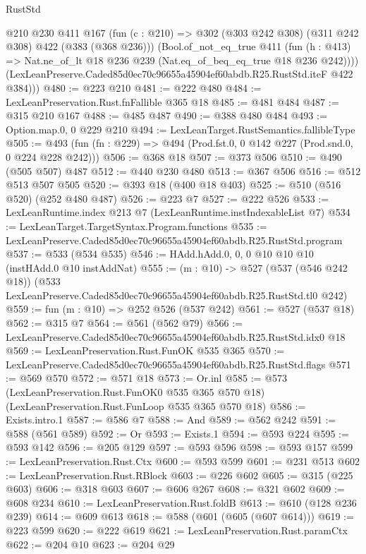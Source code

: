 \begin{lexlean}{RustStd}
\begin{coremodule}
          @210
          @230
          @411
          @167
          (fun (c : @210) => @302 (@303 @242 @308) (@311 @242 @308) @422 (@383 (@368 @236)))
          (Bool.of_not_eq_true
            @411
            (fun (h : @413) => Nat.ne_of_lt @18 @236 @239 (Nat.eq_of_beq_eq_true @18 @236 @242))))
        (LexLeanPreserve.Caded85d0ec70c96655a45904ef60abdb.R25.RustStd.iteF @422 @384)))
@480 := @223 @210
@481 := @222 @480
@484 := LexLeanPreservation.Rust.fnFallible @365 @18
@485 := @481 @484
@487 := @315 @210 @167
@488 := @485 @487
@490 := @388 @480 @484
@493 := Option.map.{0, 0} @229 @210
@494 := LexLeanTarget.RustSemantics.fallibleType
@505 := @493 (fun (fn : @229) => @494 (Prod.fst.{0, 0} @142 @227 (Prod.snd.{0, 0} @224 @228 @242)))
@506 := @368 @18
@507 := @373 @506
@510 := @490 (@505 @507) @487
@512 := @440 @230 @480
@513 := @367 @506
@516 := @512 @513 @507 @505
@520 := @393 @18 (@400 @18 @403)
@525 := @510 (@516 @520) (@252 @480 @487)
@526 := @223 @7
@527 := @222 @526
@533 := LexLeanRuntime.index @213 @7 (LexLeanRuntime.instIndexableList @7)
@534 := LexLeanTarget.TargetSyntax.Program.functions
@535 := LexLeanPreserve.Caded85d0ec70c96655a45904ef60abdb.R25.RustStd.program
@537 := @533 (@534 @535)
@546 := HAdd.hAdd.{0, 0, 0} @10 @10 @10 (instHAdd.{0} @10 instAddNat)
@555 := (m : @10) ->
  @527
    (@537 (@546 @242 @18))
    (@533 LexLeanPreserve.Caded85d0ec70c96655a45904ef60abdb.R25.RustStd.tl0 @242)
@559 := fun (m : @10) => @252 @526 (@537 @242)
@561 := @527 (@537 @18)
@562 := @315 @7
@564 := @561 (@562 @79)
@566 := LexLeanPreserve.Caded85d0ec70c96655a45904ef60abdb.R25.RustStd.idx0 @18
@569 := LexLeanPreservation.Rust.FunOK @535 @365
@570 := LexLeanPreserve.Caded85d0ec70c96655a45904ef60abdb.R25.RustStd.flags
@571 := @569 @570
@572 := @571 @18
@573 := Or.inl
@585 := @573
    (LexLeanPreservation.Rust.FunOK0 @535 @365 @570 @18)
    (LexLeanPreservation.Rust.FunLoop @535 @365 @570 @18)
@586 := Exists.intro.{1}
@587 := @586 @7
@588 := And
@589 := @562 @242
@591 := @588 (@561 @589)
@592 := Or
@593 := Exists.{1}
@594 := @593 @224
@595 := @593 @142
@596 := @205 @129
@597 := @593 @596
@598 := @593 @157
@599 := LexLeanPreservation.Rust.Ctx
@600 := @593 @599
@601 := @231 @513
@602 := LexLeanPreservation.Rust.RBlock
@603 := @226 @602
@605 := @315 (@225 @603)
@606 := @318 @603
@607 := @606 @267
@608 := @321 @602
@609 := @608 @234
@610 := LexLeanPreservation.Rust.foldB
@613 := @610 (@128 @236 @239)
@614 := @609 @613
@618 := @588 (@601 (@605 (@607 @614)))
@619 := @223 @599
@620 := @222 @619
@621 := LexLeanPreservation.Rust.paramCtx
@622 := @204 @10
@623 := @204 @29

\end{coremodule}
\end{lexlean}
